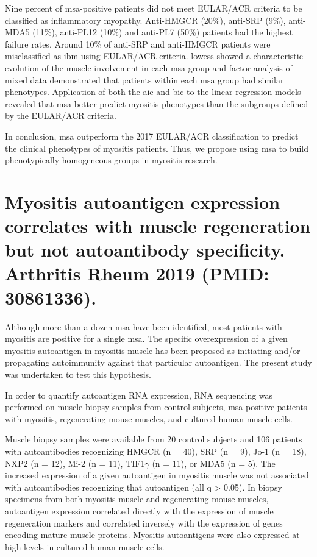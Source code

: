 Nine percent of \gls{msa}-positive patients did not meet EULAR/ACR criteria to be classified as inflammatory myopathy. Anti-HMGCR (20\%), anti-SRP (9\%), anti-MDA5 (11\%), anti-PL12 (10\%) and anti-PL7 (50\%) patients had the highest failure rates. Around 10\% of anti-SRP and anti-HMGCR patients were misclassified as \gls{ibm} using EULAR/ACR criteria. \gls{lowess} showed a characteristic evolution of the muscle involvement in each \gls{msa} group and factor analysis of mixed data demonstrated that patients within each \gls{msa} group had similar phenotypes. Application of both the \gls{aic} and \gls{bic} to the linear regression models revealed that \gls{msa} better predict myositis phenotypes than the subgroups defined by the EULAR/ACR criteria.

In conclusion, \gls{msa} outperform the 2017 EULAR/ACR classification to predict the clinical phenotypes of myositis patients. Thus, we propose using \gls{msa} to build phenotypically homogeneous groups in myositis research.


{\cleardoublepage}

\section{Myositis autoantigen expression correlates with muscle regeneration but not autoantibody specificity. Arthritis Rheum 2019 (PMID: 30861336).}
\label{sec:autoantigens}

Although more than a dozen \gls{msa} have been identified, most patients with myositis are positive for a single \gls{msa}. The specific overexpression of a given myositis autoantigen in myositis muscle has been proposed as initiating and/or propagating autoimmunity against that particular autoantigen. The present study was undertaken to test this hypothesis.

In order to quantify autoantigen RNA expression, RNA sequencing was performed on muscle biopsy samples from control subjects, \gls{msa}-positive patients with myositis, regenerating mouse muscles, and cultured human muscle cells.

Muscle biopsy samples were available from 20 control subjects and 106 patients with autoantibodies recognizing HMGCR (n = 40), SRP (n = 9), Jo-1 (n = 18), NXP2 (n = 12), Mi-2 (n = 11), TIF1$\gamma$ (n = 11), or MDA5 (n = 5). The increased expression of a given autoantigen in myositis muscle was not associated with autoantibodies recognizing that autoantigen (all q > 0.05). In biopsy specimens from both myositis muscle and regenerating mouse muscles, autoantigen expression correlated directly with the expression of muscle regeneration markers and correlated inversely with the expression of genes encoding mature muscle proteins. Myositis autoantigens were also expressed at high levels in cultured human muscle cells.

